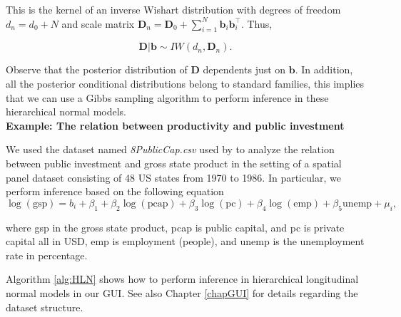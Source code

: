 This is the kernel of an inverse Wishart distribution with degrees of freedom $d_n=d_0+N$ and scale matrix $\bm{D}_n=\bm{D}_0+\sum_{i=1}^N\bm{b}_i\bm{b}_i^{\top}$. Thus,   

\begin{equation*}
	\bm{D}| \bm{b} \sim {I}{W}(d_n, \bm{D}_n).
\end{equation*}

Observe that the posterior distribution of $\bm{D}$ dependents just on $\bm{b}$. In addition, all the posterior conditional distributions belong to standard families, this implies that we can use a Gibbs sampling algorithm to perform inference in these hierarchical normal models.\\

\textbf{Example: The relation between productivity and public investment}

We used the dataset named \textit{8PublicCap.csv} used by \cite{Ramirez2017} to analyze the relation  between public investment and gross state product in the setting of a spatial panel dataset consisting of 48 US states from 1970 to 1986.
In particular, we perform inference based on the following equation 
\begin{equation*}
	\log(\text{gsp})=b_i+\beta_1+\beta_2\log(\text{pcap})+\beta_3\log(\text{pc})+\beta_4\log(\text{emp})+\beta_5\text{unemp}+\mu_i,
\end{equation*}

where gsp in the gross state product, pcap is public capital, and pc is private capital all in USD, emp is employment (people), and unemp is the unemployment rate in percentage.

Algorithm \ref{alg:HLN} shows how to perform inference in hierarchical longitudinal normal models in our GUI. See also Chapter \ref{chapGUI} for details regarding the dataset structure.

